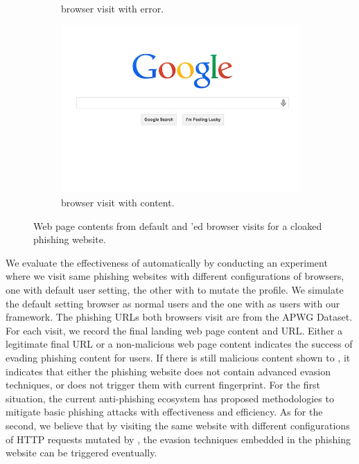 \begin{figure}
\begin{subfigure}[tb]{.31\textwidth}
        \caption{\spartacus browser visit with error.}
        \label{fig:sp1}
	\end{subfigure}%
	\quad
	\begin{subfigure}[tb]{.31\textwidth}
		\includegraphics[width=\linewidth]{figs/netflix_sp2.png}
        \caption{\spartacus browser visit with content.}
        \label{fig:sp2}
	\end{subfigure}%
	\quad
	\caption{Web page contents from default and \spartacus'ed browser visits for a cloaked phishing website.}
	\label{fig:effectiveness}
\end{figure}

We evaluate the effectiveness of \spartacus automatically by conducting an experiment where we visit same phishing websites with different configurations of browsers, one with default user setting, the other with \spartacus to mutate the profile.
We simulate the default setting browser as normal users and the one with \spartacus as users with our framework.
The phishing URLs both browsers visit are from the APWG Dataset.
For each visit, we record the final landing web page content and URL.
Either a legitimate final URL or a non-malicious web page content indicates the success of \spartacus evading phishing content for users.
If there is still malicious content shown to \spartacus, it indicates that either the phishing website does not contain advanced evasion techniques, or \spartacus does not trigger them with current fingerprint.
For the first situation, the current anti-phishing ecosystem has proposed methodologies to mitigate basic phishing attacks with effectiveness and efficiency.
As for the second, we believe that by visiting the same website with different configurations of HTTP requests mutated by \spartacus, the evasion techniques embedded in the phishing website can be triggered eventually. 

